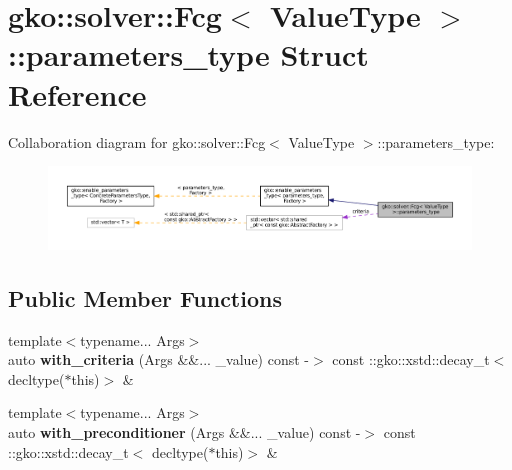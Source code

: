 \hypertarget{structgko_1_1solver_1_1Fcg_1_1parameters__type}{}\section{gko\+:\+:solver\+:\+:Fcg$<$ Value\+Type $>$\+:\+:parameters\+\_\+type Struct Reference}
\label{structgko_1_1solver_1_1Fcg_1_1parameters__type}


Collaboration diagram for gko\+:\+:solver\+:\+:Fcg$<$ Value\+Type $>$\+:\+:parameters\+\_\+type\+:
\nopagebreak
\begin{figure}[H]
\begin{center}
\leavevmode
\includegraphics[width=350pt]{structgko_1_1solver_1_1Fcg_1_1parameters__type__coll__graph}
\end{center}
\end{figure}
\subsection*{Public Member Functions}
\begin{DoxyCompactItemize}
\item 
\mbox{\label{structgko_1_1solver_1_1Fcg_1_1parameters__type_afa2b7ec764f020f0a8394c6e8154c5f4}} 
{\footnotesize template$<$typename... Args$>$ }\\auto {\bfseries with\+\_\+criteria} (Args \&\&... \+\_\+value) const -\/$>$ const \+::gko\+::xstd\+::decay\+\_\+t$<$ decltype($\ast$this)$>$ \&
\item 
\mbox{\label{structgko_1_1solver_1_1Fcg_1_1parameters__type_ad0b4f6a4e5c28928b62e6e40e37f66cb}} 
{\footnotesize template$<$typename... Args$>$ }\\auto {\bfseries with\+\_\+preconditioner} (Args \&\&... \+\_\+value) const -\/$>$ const \+::gko\+::xstd\+::decay\+\_\+t$<$ decltype($\ast$this)$>$ \&
\end{DoxyCompactItemize}
